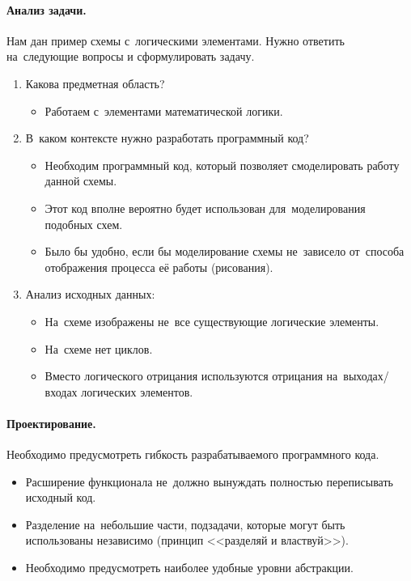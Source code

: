 \paragraph{Анализ задачи.}
Нам дан пример схемы с~логическими элементами. Нужно ответить на~следующие вопросы и сформулировать задачу.
\begin{enumerate}
    \item Какова предметная область?
    \begin{itemize}
        \item Работаем с~элементами математической логики.
    \end{itemize}

    \item В~каком контексте нужно разработать программный код?
    \begin{itemize}
        \item Необходим программный код, который позволяет смоделировать работу данной схемы.
        \item Этот код вполне вероятно будет использован для~моделирования подобных схем.
        \item Было бы удобно, если бы моделирование схемы не~зависело от~способа отображения процесса её работы (рисования).
    \end{itemize}

    \item Анализ исходных данных:
    \begin{itemize}
        \item На~схеме изображены не~все существующие логические элементы.
        \item На~схеме нет циклов.
        \item Вместо логического отрицания используются отрицания на~выходах/входах логических элементов.
    \end{itemize}
\end{enumerate}



\paragraph{Проектирование.}
Необходимо предусмотреть гибкость разрабатываемого программного кода.
\begin{itemize}
    \item Расширение функционала не~должно вынуждать полностью переписывать исходный код.
    \item Разделение на~небольшие части, подзадачи, которые могут быть использованы независимо (принцип <<разделяй и властвуй>>).
    \item Необходимо предусмотреть наиболее удобные уровни абстракции.
\end{itemize}


